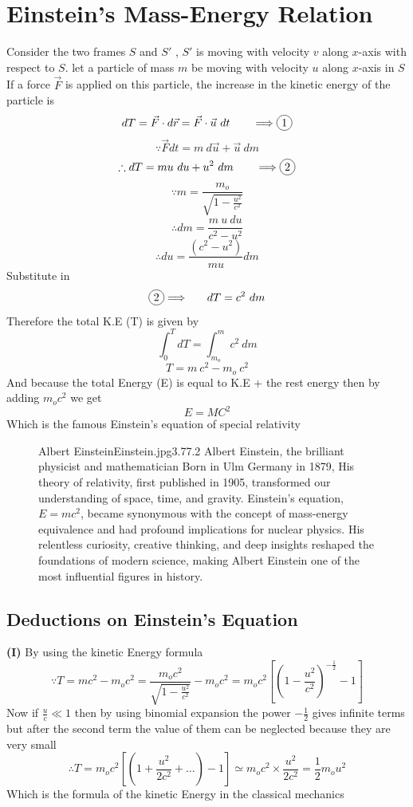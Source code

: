 \section{Einstein's Mass-Energy Relation}
Consider the two frames $S$ and $S'$ , $S'$ is moving with velocity $v$ along $x$-axis with respect to $S$.
let a particle of mass $m$ be moving with velocity $u$ along $x$-axis in $S$\\
If a force $\vec{F}$ is applied on this particle, the increase in the kinetic energy of the particle is 
\[
dT = \vec{F} \cdot d\vec{r} = \vec{F} \cdot \vec{u} \ dt \ \ \ \ \ \ \Longrightarrow \circled{1}
\]
\[
\because  \vec{F} dt = m \ d\vec{u} + \vec{u} \ dm
\]
\[
\therefore dT = mu \ du + u^2 \ dm    \ \ \ \ \ \ \Longrightarrow \circled{2}
\]
\[
\because m = \frac{m_o}{\sqrt{1 - \frac{u^2}{c^2}}} 
\]
\[
\therefore dm = \frac{m \ u \ du}{c^2 - u^2}
\]
\[
\therefore du = \frac{(c^2 - u^2)}{mu} dm
\]
Substitute in 
\[
\circled{2}  \Longrightarrow \ \ \ \ \  dT = c^2 \ dm
\]
Therefore the total K.E (T) is given by 
\[
\int_{0}^{T} dT = \int_{m_o}^{m} c^2 \ dm
\]
\[
T = m \ c^2 - m_o \ c^2
\]
And because the total Energy (E) is equal to K.E + the rest energy then by adding $m_o c^2$ we get 
\[
E = MC^2
\]
Which is the famous Einstein's equation of special relativity
\begin{figure}[b]
    \begin{enrichment}{Albert Einstein}{Einstein.jpg}{3}{.77}{.2}
        Albert Einstein, the brilliant physicist and mathematician Born in Ulm Germany in 1879,
        His theory of relativity, first published in 1905, transformed our understanding of space, time, and gravity. 
        Einstein's equation, $E=mc^2$, became synonymous with the concept of mass-energy equivalence and had profound implications for nuclear physics.
        His relentless curiosity, creative thinking, and deep insights reshaped the foundations of modern science, making Albert Einstein one of the most influential figures in history.
    \end{enrichment}
\end{figure}
\subsection{Deductions on Einstein’s Equation}

\textbf{(I)} By using the kinetic Energy formula
\[
\because T = m c^2 - m_o c^2 = \frac{m_o c^2}{\sqrt{1 - \frac{u^2}{c^2}}}  - m_o c^2 = m_o c^2 \left[{\left(1- \frac{u^2}{c^2}\right)}^{-\frac{1}{2}}-1\right]
\]
Now if $\displaystyle \frac{u}{c} \ll 1 $ then by using binomial expansion the power $-\frac{1}{2}$ gives infinite terms but after the second term the value of them can be neglected because they are very small  
\[
\therefore T = m_o c^2 \left[{\left(1+ \frac{u^2}{2c^2} + \dots \right)}-1\right] \simeq m_o c^2 \times \frac{u^2}{2c^2} = \frac{1}{2} m_o u^2
\]
Which is the formula of the kinetic Energy in the classical mechanics\\

